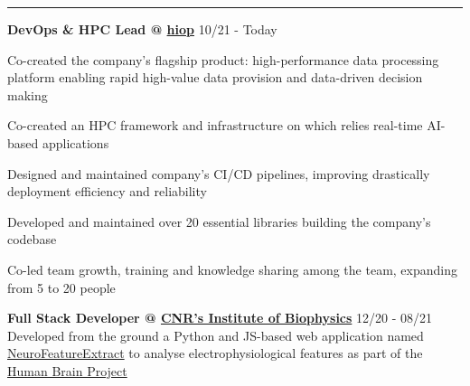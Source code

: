 \documentclass[11pt,letterpaper]{article}
\begin{document}
\begin{justify}
      \hrule
      \begin{itemize}[label={}, leftmargin=0pt]
            \begin{item}
                  \textbf{DevOps \& HPC Lead @ \href{https://hiop.io/}{hiop}}
                  \hfill
                  \small{10/21 - Today}
                  \vspace{-0.15cm}
                  \begin{itemize}[label={$\bullet$}, leftmargin=12.5pt, noitemsep]
                        \begin{item}
                              Co-created the company's flagship product: high-performance data processing platform enabling rapid high-value data provision and data-driven decision making
                        \end{item}
                        \begin{item}
                              Co-created an HPC framework and infrastructure on which relies real-time AI-based applications
                        \end{item}
                        \begin{item}
                              Designed and maintained company's CI/CD pipelines, improving drastically deployment efficiency and reliability
                        \end{item}
                        \begin{item}
                              Developed and maintained over 20 essential libraries building the company's codebase
                        \end{item}
                        \begin{item}
                              Co-led team growth, training and knowledge sharing among the team, expanding from 5 to 20 people
                        \end{item}
                  \end{itemize}
            \end{item}
            \begin{item}
                  \textbf{Full Stack Developer @ \href{https://www.ibf.cnr.it}{CNR’s Institute of Biophysics}}
                  \hfill
                  \small{12/20 - 08/21}
                  \\
                  Developed from the ground a Python and JS-based web application named \href{https://hhnb.ebrains-italy.eu/efelg/}{NeuroFeatureExtract} to analyse electrophysiological features as part of the \href{https://www.humanbrainproject.eu/en/}{Human Brain Project}

\end{item}
\end{itemize}
\end{justify}
\end{document}
